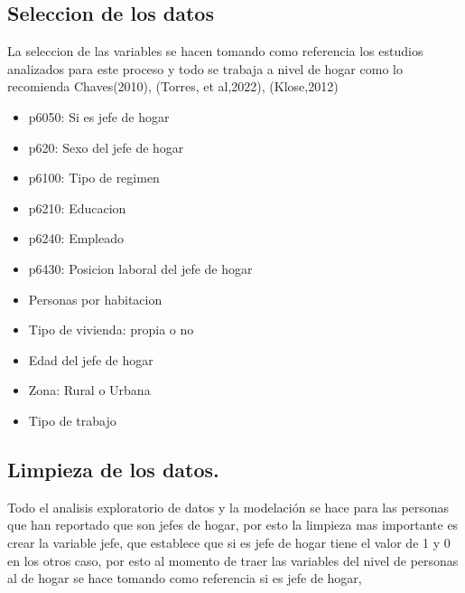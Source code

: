 \documentclass[
]{article}
\newenvironment{Shaded}{\begin{snugshade}}{\end{snugshade}}
\newcommand{\AttributeTok}[1]{\textcolor[rgb]{0.13,0.29,0.53}{#1}}
\newcommand{\DecValTok}[1]{\textcolor[rgb]{0.00,0.00,0.81}{#1}}
\newcommand{\FunctionTok}[1]{\textcolor[rgb]{0.13,0.29,0.53}{\textbf{#1}}}
\newcommand{\NormalTok}[1]{#1}
\newcommand{\OtherTok}[1]{\textcolor[rgb]{0.56,0.35,0.01}{#1}}
\newcommand{\SpecialCharTok}[1]{\textcolor[rgb]{0.81,0.36,0.00}{\textbf{#1}}}
\providecommand{\tightlist}{%
  \setlength{\itemsep}{0pt}\setlength{\parskip}{0pt}}
\begin{document}
\hypertarget{seleccion-de-los-datos}{%
\subsection{Seleccion de los datos}\label{seleccion-de-los-datos}}

La seleccion de las variables se hacen tomando como referencia los
estudios analizados para este proceso y todo se trabaja a nivel de hogar
como lo recomienda Chaves(2010), (Torres, et al,2022), (Klose,2012)

\begin{itemize}
\tightlist
\item
  p6050: Si es jefe de hogar
\item
  p620: Sexo del jefe de hogar
\item
  p6100: Tipo de regimen
\item
  p6210: Educacion
\item
  p6240: Empleado
\item
  p6430: Posicion laboral del jefe de hogar
\item
  Personas por habitacion
\item
  Tipo de vivienda: propia o no
\item
  Edad del jefe de hogar
\item
  Zona: Rural o Urbana
\item
  Tipo de trabajo
\end{itemize}

\hypertarget{limpieza-de-los-datos.}{%
\subsection{Limpieza de los datos.}\label{limpieza-de-los-datos.}}

Todo el analisis exploratorio de datos y la modelación se hace para las
personas que han reportado que son jefes de hogar, por esto la limpieza
mas importante es crear la variable jefe, que establece que si es jefe
de hogar tiene el valor de 1 y 0 en los otros caso, por esto al momento
de traer las variables del nivel de personas al de hogar se hace tomando
como referencia si es jefe de hogar,

\begin{Shaded}
\end{Shaded}
\end{document}
